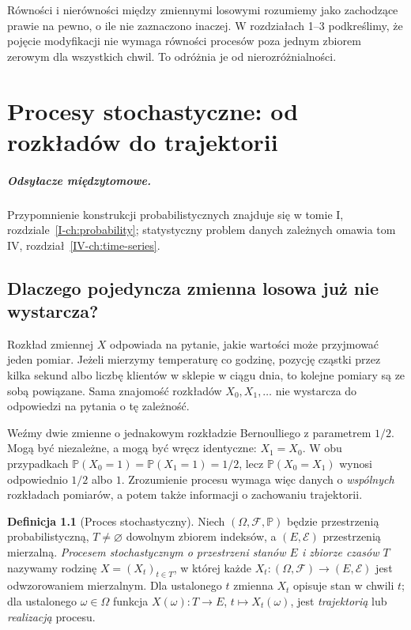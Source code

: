 \documentclass[11pt,a4paper,oneside]{report}
\numberwithin{equation}{chapter}
\theoremstyle{plain}
\theoremstyle{definition}
\newtheorem{definicja}{Definicja}[chapter]
\theoremstyle{remark}
\newcommand{\Prob}{\mathbb{P}}
\newcommand{\calF}{\mathcal{F}}
\newcommand{\calE}{\mathcal{E}}
\begin{document}
Równości i nierówności między zmiennymi losowymi rozumiemy
jako zachodzące prawie na pewno, o ile nie zaznaczono inaczej.
W rozdziałach 1--3 podkreślimy, że pojęcie modyfikacji nie wymaga
równości procesów poza jednym zbiorem zerowym dla wszystkich chwil.
To odróżnia je od nierozróżnialności.

\chapter{Procesy stochastyczne: od rozkładów do trajektorii}
\label{ch:procesy}
\paragraph{Odsyłacze międzytomowe.} Przypomnienie konstrukcji probabilistycznych znajduje się w tomie I, rozdziale~\ref{I-ch:probability}; statystyczny problem danych zależnych omawia tom IV, rozdział~\ref{IV-ch:time-series}.


\section{Dlaczego pojedyncza zmienna losowa już nie wystarcza?}
Rozkład zmiennej $X$ odpowiada na pytanie, jakie wartości może przyjmować
jeden pomiar. Jeżeli mierzymy temperaturę co godzinę, pozycję cząstki
przez kilka sekund albo liczbę klientów w sklepie w ciągu dnia, to
kolejne pomiary są ze sobą powiązane. Sama znajomość rozkładów
$X_0,X_1,\ldots$ nie wystarcza do odpowiedzi na pytania o tę zależność.

Weźmy dwie zmienne o jednakowym rozkładzie Bernoulliego z parametrem
$1/2$. Mogą być niezależne, a mogą być wręcz identyczne: $X_1=X_0$.
W obu przypadkach $\Prob(X_0=1)=\Prob(X_1=1)=1/2$, lecz
$\Prob(X_0=X_1)$ wynosi odpowiednio $1/2$ albo $1$.
Zrozumienie procesu wymaga więc danych o \emph{wspólnych} rozkładach
pomiarów, a potem także informacji o zachowaniu trajektorii.

\begin{definicja}[Proces stochastyczny]
Niech $(\Omega,\calF,\Prob)$ będzie przestrzenią probabilistyczną,
$T\ne\varnothing$ dowolnym zbiorem indeksów, a $(E,\calE)$
przestrzenią mierzalną. \emph{Procesem stochastycznym o przestrzeni
stanów $E$ i zbiorze czasów $T$} nazywamy rodzinę
$X=(X_t)_{t\in T}$, w której każde
$X_t:(\Omega,\calF)\to(E,\calE)$ jest odwzorowaniem mierzalnym.
Dla ustalonego $t$ zmienna $X_t$ opisuje stan w chwili $t$;
dla ustalonego $\omega\in\Omega$ funkcja
$X(\omega):T\to E$, $t\mapsto X_t(\omega)$, jest
\emph{trajektorią} lub \emph{realizacją} procesu.
\end{definicja}
\end{document}
